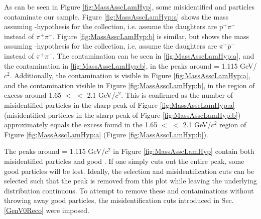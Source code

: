 \documentclass[/home/jesse/Analysis/FemtoAnalysis/AnalysisNotes/AnalysisNoteJBuxton.tex]{subfiles}
\begin{document}
As can be seen in Figure \ref{fig:MassAsscLamHyp}, some misidentified \Lam and \ALam particles contaminate our \Ks sample.
Figure \ref{fig:MassAsscLamHyp:a} shows the mass assuming \Lam-hypothesis for the \Ks collection, i.e. assume the daughters are p$^{+}\pi^{-}$ instead of $\pi^{+}\pi^{-}$.
Figure \ref{fig:MassAsscLamHyp:b} is similar, but shows the mass assuming \ALam-hypothesis for the collection, i.e. assume the daughters are $\pi^{+}\bar{p}^{-}$ instead of $\pi^{+}\pi^{-}$.
The \Lam contamination can be seen in \ref{fig:MassAsscLamHyp:a}, and the \ALam contamination in \ref{fig:MassAsscLamHyp:b}, in the peaks around \minv = 1.115 GeV/$c^{2}$.
Additionally, the \ALam contamination is visible in Figure \ref{fig:MassAsscLamHyp:a}, and the \Lam contamination visible in Figure \ref{fig:MassAsscLamHyp:b}, in the region of excess around 1.65 $<$ \minv $<$ 2.1 GeV/$c^{2}$.
This is confirmed as the number of misidentified \Lam particles in the sharp peak of Figure \ref{fig:MassAsscLamHyp:a} (misidentified \ALam particles in the sharp peak of Figure \ref{fig:MassAsscLamHyp:b}) approximately equals the excess found in the 1.65 $<$ \minv $<$ 2.1 GeV/$c^{2}$ region of Figure \ref{fig:MassAsscLamHyp:a} (Figure \ref{fig:MassAsscLamHyp:b}).

The peaks around \minv = 1.115 GeV/$c^{2}$ in Figure \ref{fig:MassAsscLamHyp} contain both misidentified \LamALam particles and good \Ks.
If one simply cuts out the entire peak, some good \Ks particles will be lost.
Ideally, the \Ks selection and \LamALam misidentification cuts can be selected such that the peak is removed from this plot while leaving the underlying distribution continuous.
To attempt to remove these \Lam and \ALam contaminations without throwing away good \Ks particles, the misidentification cuts introduced in Sec. \ref{GenV0Reco} were imposed.
\end{document}
